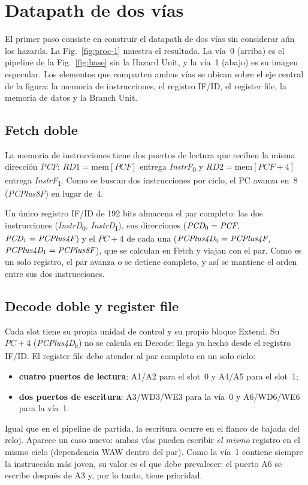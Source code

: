 \documentclass[11pt,a4paper]{article}
\newcommand{\sig}[1]{\textit{#1}}
\newcommand{\sigk}[2]{\textit{#1}\textsubscript{#2}}
\begin{document}
\section{Datapath de dos vías}
\label{sec:lanes}

El primer paso consiste en construir el datapath de dos vías sin considerar aún los
hazards. La Fig.~\ref{fig:proc-1} muestra el resultado. La vía~0 (arriba) es el pipeline
de la Fig.~\ref{fig:base} sin la Hazard Unit, y la vía~1 (abajo) es su imagen especular.
Los elementos que comparten ambas vías se ubican sobre el eje central de la figura: la
memoria de instrucciones, el registro IF/ID, el register file, la memoria de datos y la
Branch Unit.

\subsection{Fetch doble}

La memoria de instrucciones tiene dos puertos de lectura que reciben la misma dirección
\sig{PCF}: $\sig{RD1} = \text{mem}[\sig{PCF}]$ entrega \sigk{InstrF}{0} y
$\sig{RD2} = \text{mem}[\sig{PCF}+4]$ entrega \sigk{InstrF}{1}. Como se buscan dos
instrucciones por ciclo, el PC avanza en~8 (\sig{PCPlus8F}) en lugar de~4.

Un único registro IF/ID de 192 bits almacena el par completo: las dos instrucciones
(\sigk{InstrD}{0}, \sigk{InstrD}{1}), sus direcciones ($\sigk{PCD}{0} = \sig{PCF}$,
$\sigk{PCD}{1} = \sig{PCPlus4F}$) y el $\sig{PC}+4$ de cada una
($\sigk{PCPlus4D}{0} = \sig{PCPlus4F}$, $\sigk{PCPlus4D}{1} = \sig{PCPlus8F}$), que se
calculan en Fetch y viajan con el par. Como es un solo registro, el par avanza o se detiene
completo, y así se mantiene el orden entre sus dos instrucciones.

\subsection{Decode doble y register file}

Cada slot tiene su propia unidad de control y su propio bloque Extend. Su $\sig{PC}+4$
(\sigk{PCPlus4D}{k}) no se calcula en Decode: llega ya hecho desde el registro IF/ID. El
register file debe atender al par completo
en un solo ciclo:
\begin{itemize}
  \item \textbf{cuatro puertos de lectura}: A1/A2 para el slot~0 y A4/A5 para el slot~1;
  \item \textbf{dos puertos de escritura}: A3/WD3/WE3 para la vía~0 y A6/WD6/WE6 para la vía~1.
\end{itemize}
Igual que en el pipeline de partida, la escritura ocurre en el flanco de bajada del
reloj. Aparece un caso nuevo: ambas vías pueden escribir \emph{el mismo} registro en el
mismo ciclo (dependencia WAW dentro del par). Como la vía~1 contiene siempre la instrucción más
joven, su valor es el que debe prevalecer: el puerto A6 se escribe después de A3 y, por
lo tanto, tiene prioridad.
\end{document}
